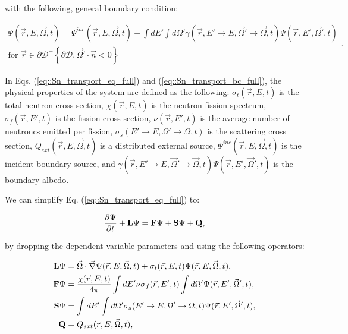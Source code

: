 \noindent with the following, general boundary condition:

\begin{equation}
\label{eq::Sn_transport_bc_full}
\begin{aligned}
	\Psi (\vec{r}, E, \vec{\Omega},t) = \Psi^{inc} (\vec{r}, E, \vec{\Omega},t) + \int dE' \int d\Omega' \gamma (\vec{r}, E' \rightarrow E, \vec{\Omega}' \rightarrow \vec{\Omega},t) \Psi (\vec{r}, E', \vec{\Omega}',t) \\
	\text{for } \vec{r} \in \partial \mathcal{D}^{-} \left\{   \partial \mathcal{D}, \vec{\Omega}' \cdot \vec{n} < 0  \right\}
\end{aligned} .
\end{equation}

\noindent In Eqs. (\ref{eq::Sn_transport_eq_full}) and (\ref{eq::Sn_transport_bc_full}), the physical properties of the system are defined as the following: $\sigma_t (\vec{r}, E,t)$ is the total neutron cross section, $\chi (\vec{r}, E,t)$ is the neutron fission spectrum, $\sigma_f (\vec{r}, E',t)$ is the fission cross section, $\nu (\vec{r}, E',t)$ is the average number of neutroncs emitted per fission, $\sigma_s (E' \rightarrow E, \Omega' \rightarrow \Omega,t)$ is the scattering cross section, $Q_{ext} (\vec{r}, E, \vec{\Omega},t)$ is a distributed external source, $\Psi^{inc} (\vec{r}, E, \vec{\Omega},t)$ is the incident boundary source, and $\gamma (\vec{r}, E' \rightarrow E, \vec{\Omega}' \rightarrow \vec{\Omega},t) \Psi (\vec{r}, E', \vec{\Omega}',t)$ is the boundary albedo. 

We can simplify Eq. (\ref{eq::Sn_transport_eq_full}) to:

\begin{equation}
\label{eq::Sn_transport_eq_op}
	\frac{\partial \Psi}{\partial t} + {\bf L} \Psi =  {\bf F} \Psi  + {\bf S} \Psi + {\bf Q},
\end{equation}

\noindent by dropping the dependent variable parameters and using the following operators:

\begin{equation}
\label{eq::Sn_transport_operators}
\begin{aligned}
	{\bf L} \Psi &= \vec{\Omega} \cdot \vec{\nabla} \Psi (\vec{r}, E, \vec{\Omega},t)+ \sigma_t (\vec{r}, E,t) \Psi (\vec{r}, E, \vec{\Omega},t), \\
	{\bf F} \Psi &= \frac{\chi (\vec{r}, E,t)}{4 \pi} \int dE' \nu \sigma_f (\vec{r}, E',t) \int d\Omega' \Psi (\vec{r}, E', \vec{\Omega}',t), \\
	{\bf S} \Psi &= \int dE' \int d\Omega' \sigma_s (E' \rightarrow E, \Omega' \rightarrow \Omega, t) \Psi (\vec{r}, E', \vec{\Omega}', t),  \\
	{\bf Q}       & = Q_{ext} (\vec{r}, E, \vec{\Omega},t) ,
\end{aligned}
\end{equation}

